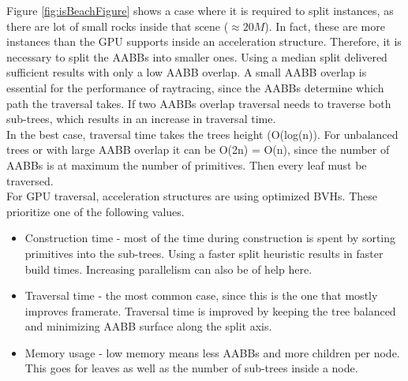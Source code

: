 Figure \ref{fig:isBeachFigure} shows a case where it is required to split instances, as there are lot of small rocks inside that scene ($\approx 20M$). In fact, these are more instances than the GPU supports inside an acceleration structure. Therefore, it is necessary to split the AABBs into smaller ones. Using a median split delivered sufficient results with only a low AABB overlap. A small AABB overlap is essential for the performance of raytracing, since the AABBs determine which path the traversal takes. If two AABBs overlap traversal needs to traverse both sub-trees, which results in an increase in traversal time.\\
In the best case, traversal time takes the trees height (O(log(n)). For unbalanced trees or with large AABB overlap it can be O(2n) = O(n), since the number of AABBs is at maximum the number of primitives. Then every leaf must be traversed.\\
For GPU traversal, acceleration structures are using optimized BVHs. These prioritize one of the following values.
\begin{itemize}
    \item Construction time - most of the time during construction is spent by sorting primitives into the sub-trees. Using a faster split heuristic results in faster build times. Increasing parallelism can also be of help here. 
    \item Traversal time - the most common case, since this is the one that mostly improves framerate. Traversal time is improved by keeping the tree balanced and minimizing AABB surface along the split axis.
    \item Memory usage - low memory means less AABBs and more children per node. This goes for leaves as well as the number of sub-trees inside a node.
\end{itemize}
\newpage
